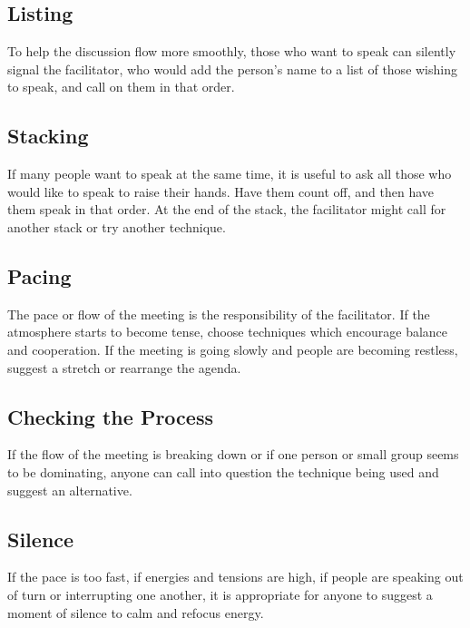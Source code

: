 \subsection{Listing}

To help the discussion flow more smoothly, those who want to speak
can silently signal the facilitator, who would add the person's
name to a list of those wishing to speak, and call on them in that
order.

\subsection{Stacking}

If many people want to speak at the same time, it is useful to ask
all those who would like to speak to raise their hands. Have them
count off, and then have them speak in that order. At the end of
the stack, the facilitator might call for another stack or try
another technique.

\subsection{Pacing}

The pace or flow of the meeting is the responsibility of the
facilitator.  If the atmosphere starts to become tense, choose
techniques which encourage balance and cooperation. If the meeting
is going slowly and people are becoming restless, suggest a stretch
or rearrange the agenda.

\subsection{Checking the Process}

If the flow of the meeting is breaking down or if one person or
small group seems to be dominating, anyone can call into question
the technique being used and suggest an alternative.

\subsection{Silence}

If the pace is too fast, if energies and tensions are high, if
people are speaking out of turn or interrupting one another, it is
appropriate for anyone to suggest a moment of silence to calm and
refocus energy.

